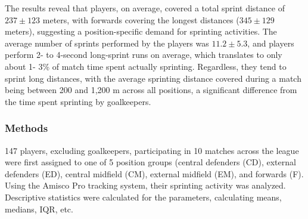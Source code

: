 The results \cite{Andrzejewski2013} reveal that players, on average, covered a total sprint distance of $237 \pm 123$ meters, with forwards covering the longest distances ($345 \pm 129$ meters), suggesting a position-specific demand for sprinting activities. The average number of sprints performed by the players was $11.2 \pm 5.3$, and players perform 2- to 4-second long-sprint runs on average, which translates to only about 1- 3\% of match time spent actually sprinting. Regardless, they tend to sprint long distances, with the average sprinting distance covered during a match being between 200 and 1,200 m across all positions, a significant difference from the time spent sprinting by goalkeepers. 


\subsubsection{Methods} 
147 players, excluding goalkeepers, participating in 10 matches across the league were first assigned to one of 5 position groups (central defenders (CD), external defenders (ED), central midfield (CM), external midfield (EM), and forwards (F). Using the Amisco Pro tracking system, their sprinting activity was analyzed. Descriptive statistics were calculated for the parameters, calculating means, medians, IQR, etc. 

